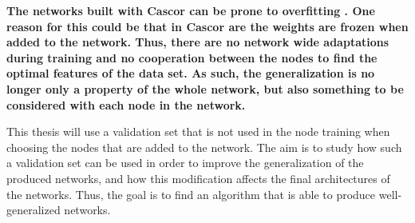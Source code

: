 \documentclass[a4paper,11pt, usenatbib]{article}
\begin{document}





\textbf{The networks built with Cascor can be prone to overfitting \cite{lahnajarvi_evaluation_2002, balazs_cascade-correlation_2009}. One reason for this could be that in Cascor are the weights are frozen when added to the network. Thus, there are no network wide adaptations during training and no cooperation between the nodes to find the optimal features of the data set. As such, the generalization is no longer only a property of the whole network, but also something to be considered with each node in the network. }


This thesis will use a validation set that is not used in the node training when choosing the nodes that are added to the network. The aim is to study how such a validation set can be used in order to improve the generalization of the produced networks, and how this modification affects the final architectures of the networks. Thus, the goal is to find an algorithm that is able to produce well-generalized networks.
\end{document}
